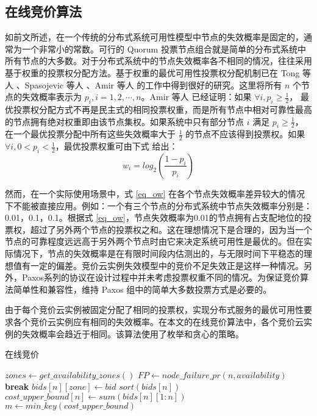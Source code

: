 \subsection{在线竞价算法}
\label{subsec:jupiter-bidding}
如前文所述，在一个传统的分布式系统可用性模型中节点的失效概率是固定的，通常为一个非常小的常数。可行的 Quorum 投票节点组合就是简单的分布式系统中所有节点的大多数。对于分布式系统中的节点失效概率各不相同的情况，往往采用基于权重的投票权分配方法。基于权重的最优可用性投票权分配机制已在 Tong 等人 \cite{25789}、Spasojevic 等人 \cite{262589}、Amir 等人 \cite{Amir1998223} 的工作中得到很好的研究。这里将所有 $n$ 个节点的失效概率表示为 $p_i, i = 1, 2, \cdots, n$。Amir 等人 \cite{Amir1998223} 已经证明：如果 $\forall i, p_i \geq \frac{1}{2}$， 最优投票权分配方式不再是民主式的相同投票权重，而是所有节点中相对可靠性最高的节点拥有绝对权重即由该节点集权。如果系统中只有部分节点 $i$ 满足 $p_i \geq \frac{1}{2}$， 在一个最优投票分配中所有这些失效概率大于 $\frac{1}{2}$ 的节点不应该得到投票权。如果 $\forall i, 0 < p_i < \frac{1}{2}$，最优投票权重可由下式 \cite{262589, 25789} 给出：
\begin{equation}\label{eq_ow}
w_i = log_2(\frac{1-p_i}{p_i})
\end{equation}

然而，在一个实际使用场景中，式 \eqref{eq_ow} 在各个节点失效概率差异较大的情况下不能被直接应用。例如：一个有三个节点的分布式系统中节点失效概率分别是：0.01，0.1，0.1。根据式 \eqref{eq_ow}，节点失效概率为0.01的节点拥有占支配地位的投票权，超过了另外两个节点的投票权之和。这在理想情况下是合理的，因为当一个节点的可靠程度远远高于另外两个节点时由它来决定系统可用性是最优的。但在实际情况下，节点的失效概率是在有限时间段内估测出的，与无限时间下平稳态的理想值有一定的偏差。竞价云实例失效模型中的竞价不足失效正是这样一种情况。另外，Paxos系列的协议在设计过程中并未考虑投票权重不同的情况。为保证竞价算法简单性和兼容性，维持 Paxos 组中的简单大多数投票方式是必要的。

由于每个竞价云实例被固定分配了相同的投票权，实现分布式服务的最优可用性要求各个竞价云实例应有相同的失效概率。在本文的在线竞价算法中，各个竞价云实例的失效概率会趋近于相同。该算法使用了枚举和贪心的策略。

\begin{algorithm}
\caption{在线竞价}
\label{algo:bidding}
$zones\gets get\_availability\_zones()$
{
  $FP\gets node\_failure\_pr(n, availability)$
  {
    \ForEach{$bid \in [zone.spot\_prices[1], zone.on\_demand\_price)$}
    {
      {
        \textbf{break}
      }
    }
    $bids[n][zone]\gets bid$\;
  }
  $sort(bids[n])$\;
  $cost\_upper\_bound[n]\gets sum(bids[n][1:n])$\;
}
$m\gets min\_key(cost\_upper\_bound)$\;
\;
\end{algorithm}

